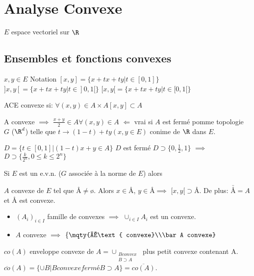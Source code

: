 \chapter{Analyse Convexe} %
\label{cha:analyse_convexe}
$E$ espace vectoriel sur $\R$

\section{Ensembles et fonctions convexes} %
\label{sec:ensembles_et_fonctions_convexes}
$x,y\in E$ Notation
$[x,y]=\{x+tx+ty| t\in [0,1]\}$
$]x,y[=\{x+tx+ty| t\in ]0,1[\}$
$[x,y[=\{x+tx+ty| t\in [0,1[\}$

\begin{definition}
	ACE convexe si:
	$\forall (x,y)\in A\times A [x,y]\subset A$
\end{definition}
\begin{remark}
	A convexe $\implies$ $\frac{x+y}{2} \in A \forall (x,y)\in A$
	$\Leftarrow$ vrai si $A$ est fermé pomme topologie $G$ ($\R^d$) telle que $t\rightarrow (1-t)+ty (x,y\in E)$ conime de $\R$ dans $E$. 
\end{remark}
\begin{remark}[indication]
	$D=\{t\in [0,1]|(1-t)x+y\in A\}$
	$D$ est fermé $D\supset \{ 0,\frac12,1\} $ $\implies$ $ D\supset \{\frac k{2^n}, 0≤k≤2^n\}$
\end{remark}
Si $E$ est un e.v.n. ($G$ associée à la norme de $E$) alors
\begin{lemme}
	$A$ convexe de $E$ tel que $Å≠ø$. Alors $x\in Å$, $y\in Å $$\implies$ $[x,y[\supset Å$. De plus:
	$\bar Å=A$ et $Å$ est convexe.
\end{lemme}
\begin{theorem}[properties]
	\begin{itemize}
		\item $(A_i)_{i\in I}$ famille de convexes $\implies$ $\cup_{i\in I}A_i$ est un convexe.
		\item $A$ convexe $\implies$ $\left\{\mqty{Å\text{ convexe}\\\bar A convexe}\right.$
	\end{itemize}
\end{theorem}
\begin{definition}
	$co(A)$ enveloppe convexe de $A = \cup_{\substack{B convex\\B\supset A}}$ plus petit convexe contenant A.
	$\overline{co}(A)=\{\cup B|B convexe fermé B\supset A\}=\overline{co(A)}$.
\end{definition}

